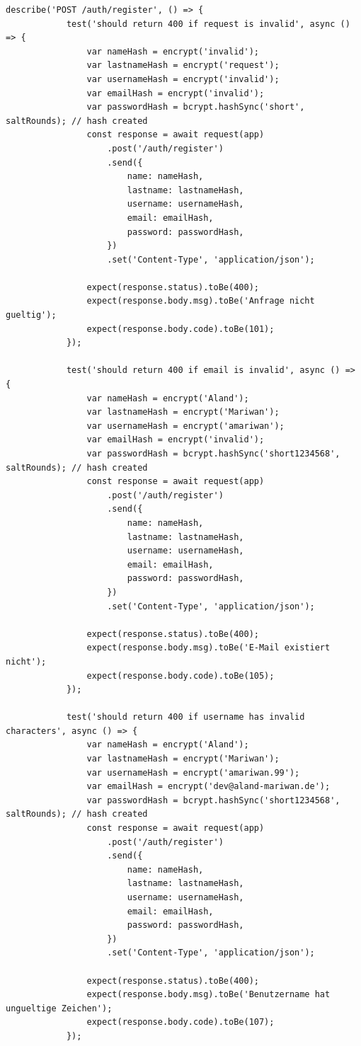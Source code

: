 	\begin{lstlisting}[caption={Neue Benutzer hinzufügen (Backend) Unit-Tests}, style=js]
		describe('POST /auth/register', () => {
			test('should return 400 if request is invalid', async () => {
				var nameHash = encrypt('invalid');
				var lastnameHash = encrypt('request');
				var usernameHash = encrypt('invalid');
				var emailHash = encrypt('invalid');
				var passwordHash = bcrypt.hashSync('short', saltRounds); // hash created
				const response = await request(app)
					.post('/auth/register')
					.send({
						name: nameHash,
						lastname: lastnameHash,
						username: usernameHash,
						email: emailHash,
						password: passwordHash,
					})
					.set('Content-Type', 'application/json');

				expect(response.status).toBe(400);
				expect(response.body.msg).toBe('Anfrage nicht gueltig');
				expect(response.body.code).toBe(101);
			});

			test('should return 400 if email is invalid', async () => {
				var nameHash = encrypt('Aland');
				var lastnameHash = encrypt('Mariwan');
				var usernameHash = encrypt('amariwan');
				var emailHash = encrypt('invalid');
				var passwordHash = bcrypt.hashSync('short1234568', saltRounds); // hash created
				const response = await request(app)
					.post('/auth/register')
					.send({
						name: nameHash,
						lastname: lastnameHash,
						username: usernameHash,
						email: emailHash,
						password: passwordHash,
					})
					.set('Content-Type', 'application/json');

				expect(response.status).toBe(400);
				expect(response.body.msg).toBe('E-Mail existiert nicht');
				expect(response.body.code).toBe(105);
			});

			test('should return 400 if username has invalid characters', async () => {
				var nameHash = encrypt('Aland');
				var lastnameHash = encrypt('Mariwan');
				var usernameHash = encrypt('amariwan.99');
				var emailHash = encrypt('dev@aland-mariwan.de');
				var passwordHash = bcrypt.hashSync('short1234568', saltRounds); // hash created
				const response = await request(app)
					.post('/auth/register')
					.send({
						name: nameHash,
						lastname: lastnameHash,
						username: usernameHash,
						email: emailHash,
						password: passwordHash,
					})
					.set('Content-Type', 'application/json');

				expect(response.status).toBe(400);
				expect(response.body.msg).toBe('Benutzername hat ungueltige Zeichen');
				expect(response.body.code).toBe(107);
			});


\end{lstlisting}
